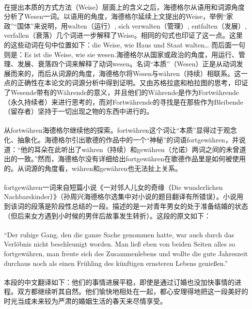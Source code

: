 \documentclass{article}
\begin{document}
			\paragraph{}
			在提出本质的方式方法（Weise）层面上的含义之后，海德格尔从语用和词源角度分析了Wesen一词。以语用的角度，海德格尔延续上文提出的Weise，举例“家政”“国体”来说明，用walten（运行）, sich verwalten（管理）, entfalten（发展）, verfallen（衰落）几个词进一步解释了Weise。相同的句式也印证了这一点。这里的这些动词在句中位置如下：die Weise, wie Haus und Staat walten… 而后面一句则是：Es ist die Weise, wie sie wesen.海德格尔从国家或政治的角度，用运行、管理、发展、衰落四个词来解释了动词wesen。名词“本质”（Wesen）正是从动词发展而来的，而后从词源的角度，海德格尔将Wesen与währen（持续）相联系。这一点的正确性在本论文的词源分析中得到证明。又由苏格拉底和柏拉图的思考，印证了Wesende带有的Währende的意义，并且他们的Währende是作为Fortwährende（永久持续者）来进行思考的，而对Fortwährende的寻找是在那些作为Bleibende（留存者）坚持于一切出现之物的东西中进行的。
			\paragraph{}
		从fortwähren海德格尔继续他的探索。fortwähren这个词让“本质”显得过于观念化、抽象化。海德格尔引出歌德的作品中的一个“神秘”的词语fortgewähren，并说道：“他的耳朵在此听出了währen（持续）和gewähren（允诺）两词之间的未曾道出的一致。”然而，海德格尔没有详细给出fortgewähren在歌德作品里是如何被使用的。从词源的角度看，währen和gewähren也无法扯上关系。
			\paragraph{}
		fortgewähren一词来自短篇小说《一对邻人儿女的奇缘（Die wunderlichen Nachbarskinder）》（孙周兴海德格尔选集中对小说的题目翻译有所错误）。小说用到该词的段落是阶段性总结的一段。描述的是一对青年男女的处于准备结婚的状态（但后来女方遇到小时候的男伴后故事发生转折）。这段的原文如下：
			\paragraph{}
		“Der ruhige Gang, den die ganze Sache genommen hatte, war auch durch das Verlöbnis nicht beschleunigt worden. Man ließ eben von beiden Seiten alles so fortgewähren, man freute sich des Zusammenlebens und wollte die gute Jahreszeit durchaus noch als einen Frühling des künftigen ernsteren Lebens genießen.”\cite{wNachbarK_Goet}
			\paragraph{}
			本段的中文翻译如下：他们的事情进展平稳，即使是通过订婚也没加快事情的进程。双方都继续听其自然。他们愉快地相处在一起，都心安理得地把这一段美好的时光当成未来较为严肃的婚姻生活的春天来尽情享受。\cite{wNachbarK_trans}
\end{document}
